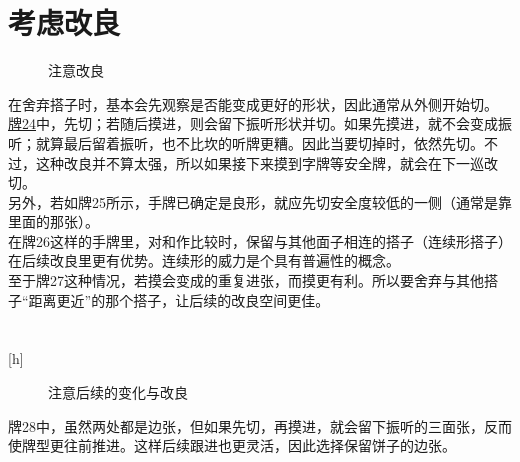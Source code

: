 \section{考虑改良}
\begin{figure}
    \caption{注意改良}
    \label{lec6:pai24-26}
    \par\bigskip
    \par\bigskip
    \par\bigskip
\end{figure}
在舍弃搭子时，基本会先观察是否能变成更好的形状，因此通常从外侧开始切。
\hyperlink{lec6:pai24-26}{牌24}中，先切；若随后摸进，则会留下振听形状并切。如果先摸进，就不会变成振听；就算最后留着振听，也不比坎的听牌更糟。因此当要切掉时，依然先切。不过，这种改良并不算太强，所以如果接下来摸到字牌等安全牌，就会在下一巡改切。\\
另外，若如牌25所示，手牌已确定是良形，就应先切安全度较低的一侧（通常是靠里面的那张）。\\
在牌26这样的手牌里，对和作比较时，保留与其他面子相连的搭子（连续形搭子）在后续改良里更有优势。连续形的威力是个具有普遍性的概念。\\
至于牌27这种情况，若摸会变成的重复进张，而摸更有利。所以要舍弃与其他搭子“距离更近”的那个搭子，让后续的改良空间更佳。

\section{}[h]
\begin{figure}
    \caption{注意后续的变化与改良}
    \label{lec6:pai28-29}
    \par\bigskip
\end{figure}

牌28中，虽然两处都是边张，但如果先切，再摸进，就会留下振听的三面张，反而使牌型更往前推进。这样后续跟进也更灵活，因此选择保留饼子的边张。

